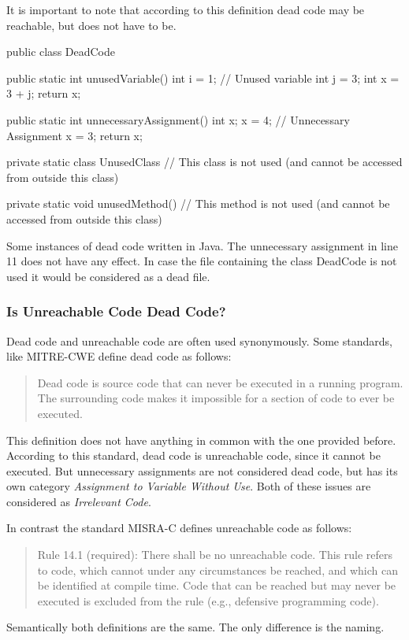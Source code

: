 It is important to note that according to this definition dead code may be reachable, but does not have to be.



\begin{program}[h!]
	\begin{JavaCode}
		public class DeadCode {
			public static int unusedVariable() {
				int i = 1; // Unused variable
				int j = 3;
				int x = 3 + j;
				return x;
			}
			
			public static int unnecessaryAssignment() {
				int x;
				x = 4; // Unnecessary Assignment
				x = 3;
				return x;
			}
			
			private static class UnusedClass {
				// This class is not used (and cannot be accessed from outside this class)
			}
			
			private static void unusedMethod() {
				// This method is not used (and cannot be accessed from outside this class)
			}
	}\end{JavaCode}
	\caption{Some instances of dead code written in Java. The unnecessary assignment in line 11 does not have any effect. In case the file containing the class DeadCode is not used it would be considered as a dead file.}
	\label{code:dead code}
\end{program}

\subsubsection{Is Unreachable Code Dead Code?}
Dead code and unreachable code are often used synonymously. 
Some standards, like MITRE-CWE \cite{CWECWE561Dead} define dead code as follows:
\begin{quote}
	Dead code is source code that can never be executed in a running program. The surrounding code makes it impossible for a section of code to ever be executed.
\end{quote}
This definition does not have anything in common with the one provided before. According to this standard, dead code is unreachable code, since it cannot be executed. But unnecessary assignments are not considered dead code, but has its own category \emph{Assignment to Variable Without Use}.
Both of these issues are considered as \emph{Irrelevant Code}.

\pagebreak
In contrast the standard MISRA-C \cite{motorindustrysoftwarereliabilityassociationMISRAC2004Guidelines2008} defines unreachable code as follows:
\begin{quote}
	Rule 14.1 (required): There shall be no unreachable code.
	This  rule  refers  to  code,  which  cannot  under  any  circumstances  be  reached,  and  which  can  be 
	identified at compile time. Code that can be reached but may never be executed is excluded 
	from the rule (e.g., defensive programming code).	
\end{quote}
Semantically both definitions are the same. The only difference is the naming.


